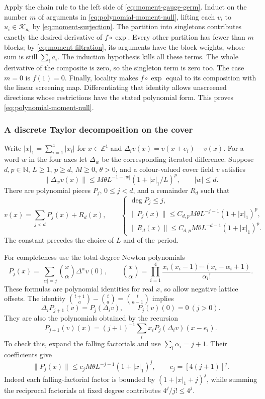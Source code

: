 Apply the chain rule to the left side of
\eqref{eq:moment-gauge-germ}. Induct on the number $m$ of
arguments in \eqref{eq:polynomial-moment-null}, lifting each
$v_i$ to $u_i\in\mathcal K_{a_i}$ by
\eqref{eq:moment-surjection}. The partition into singletons
contributes exactly the desired derivative of $f\circ\exp$.
Every other partition has fewer than $m$ blocks; by
\eqref{eq:moment-filtration}, its arguments have the block
weights, whose sum is still $\sum_i a_i$. The induction hypothesis
kills all these terms. The whole derivative of the composite
is zero, so the singleton term is zero too. The case $m=0$ is
$f(1)=0$. Finally, locality makes $f\circ\exp$ equal to its
composition with the linear screening map. Differentiating that
identity allows unscreened directions whose restrictions have
the stated polynomial form. This proves
\eqref{eq:polynomial-moment-null}.

\subsubsection{A discrete Taylor decomposition on the cover}
Write $|x|_1=\sum_{i=1}^4|x_i|$ for $x\in\mathbb Z^4$ and
$\Delta_i v(x)=v(x+e_i)-v(x)$. For a word $w$ in the four
axes let $\Delta_w$ be the corresponding iterated difference.
Suppose $d,p\in\mathbb N$, $L\ge1$, $p\ge d$, $M\ge0$,
$\theta>0$, and a colour-valued cover field $v$
satisfies
\begin{equation}\label{eq:moment-drift}
 \|\Delta_wv(x)\|\le M\theta L^{-1-|w|}
                       (1+|x|_1/L)^p,
                  \qquad |w|\le d.
\end{equation}
There are polynomial pieces $P_j$, $0\le j<d$, and a remainder
$R_d$ such that
\begin{equation}\label{eq:moment-newton}
 v(x)=\sum_{j<d}P_j(x)+R_d(x),\qquad
 \begin{cases}
 \deg P_j\le j,\\
 \|P_j(x)\|\le C_{d,p}M\theta L^{-j-1}(1+|x|_1)^p,\\
 \|R_d(x)\|\le C_{d,p}M\theta L^{-d-1}(1+|x|_1)^p.
 \end{cases}
\end{equation}
The constant precedes the choice of $L$ and of the period.

For completeness use the total-degree Newton polynomials
\[
 P_j(x)=\sum_{|\alpha|=j}\binom{x}{\alpha}\Delta^\alpha v(0),
 \qquad
 \binom{x}{\alpha}=\prod_{i=1}^4
       \frac{x_i(x_i-1)\cdots(x_i-\alpha_i+1)}{\alpha_i!}.
\]
These formulas are polynomial identities for real $x$, so allow
negative lattice offsets. The identity
$\binom{t+1}{a}-\binom ta=\binom t{a-1}$ implies
\[
 \Delta_i P_{j+1}(v)=P_j(\Delta_i v),\qquad
 P_j(v)(0)=0\ (j>0).
\]
They are also the polynomials obtained by the recursion
\[
 P_{j+1}(v)(x)=(j+1)^{-1}\sum_i x_iP_j(\Delta_i v)(x-e_i).
\]
To check this, expand the falling factorials and use $\sum_i\alpha_i=j+1$.
Their coefficients give
\[
 \|P_j(x)\|\le c_jM\theta L^{-j-1}(1+|x|_1)^j,
                         \qquad c_j=[4(j+1)]^j.
\]
Indeed each falling-factorial factor is bounded by
$(1+|x|_1+j)^j$, while summing the reciprocal factorials at
fixed degree contributes $4^j/j!\le4^j$.

